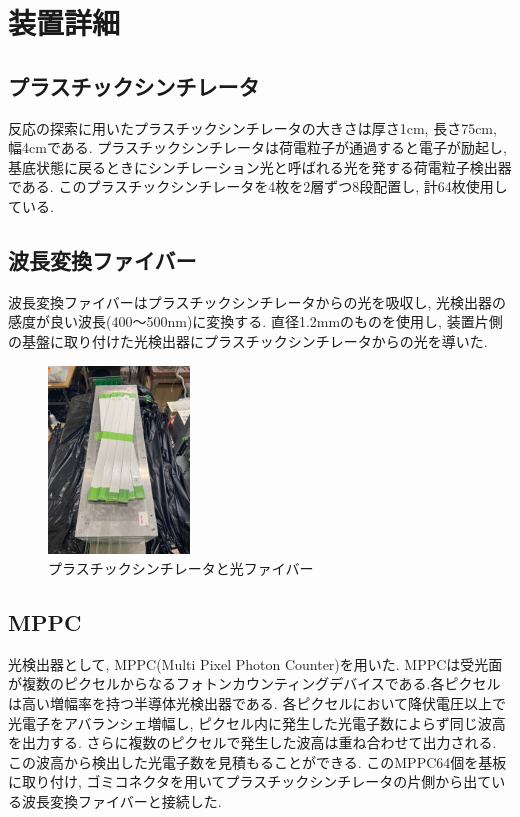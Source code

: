 \section{装置詳細}
\subsection{プラスチックシンチレータ}
反応の探索に用いたプラスチックシンチレータの大きさは厚さ1cm, 長さ75cm, 幅4cmである.
プラスチックシンチレータは荷電粒子が通過すると電子が励起し, 基底状態に戻るときにシンチレーション光と呼ばれる光を発する荷電粒子検出器である.
このプラスチックシンチレータを4枚を2層ずつ8段配置し, 計64枚使用している.

\subsection{波長変換ファイバー}
波長変換ファイバーはプラスチックシンチレータからの光を吸収し, 光検出器の感度が良い波長(400～500nm)に変換する.
直径1.2mmのものを使用し, 装置片側の基盤に取り付けた光検出器にプラスチックシンチレータからの光を導いた.

\begin{figure}[H]
    \centering
    \includegraphics[height=5cm]{img/Scinti.jpeg}
    \caption{プラスチックシンチレータと光ファイバー}
    \label{fig:fiber}
\end{figure}

\subsection{MPPC}
光検出器として, MPPC(Multi Pixel Photon Counter)を用いた.
MPPCは受光面が複数のピクセルからなるフォトンカウンティングデバイスである.各ピクセルは高い増幅率を持つ半導体光検出器である.
各ピクセルにおいて降伏電圧以上で光電子をアバランシェ増幅し, ピクセル内に発生した光電子数によらず同じ波高を出力する.
さらに複数のピクセルで発生した波高は重ね合わせて出力される.
この波高から検出した光電子数を見積もることができる.
このMPPC64個を基板に取り付け, ゴミコネクタを用いてプラスチックシンチレータの片側から出ている波長変換ファイバーと接続した.

